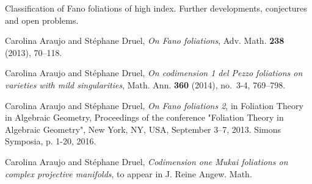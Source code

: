 \documentclass[12pt]{article}
\begin{document}
 Classification of Fano foliations of high index. Further developments, conjectures and open problems. 





\begin{thebibliography}{xxxxxx}


{Carolina Araujo and St{\'e}phane Druel, \emph{On {F}ano foliations}, Adv. Math.
  \textbf{238} (2013), 70--118.}
  
{Carolina Araujo and St{\'e}phane Druel, \emph{On codimension 1 del {P}ezzo foliations on varieties with mild
  singularities}, Math. Ann. \textbf{360} (2014), no.~3-4, 769--798.}

{Carolina Araujo and St{\'e}phane Druel, \emph{On {F}ano foliations 2}, in Foliation Theory in Algebraic Geometry, Proceedings of the conference "Foliation Theory in Algebraic Geometry", New York, NY, USA, September 3--7, 2013. Simons Symposia, p. 1-20, 2016.}

{Carolina Araujo and St{\'e}phane Druel, \emph{Codimension one Mukai foliations on complex projective
  manifolds}, to appear in J. Reine Angew. Math. }

\end{thebibliography}
\end{document}
